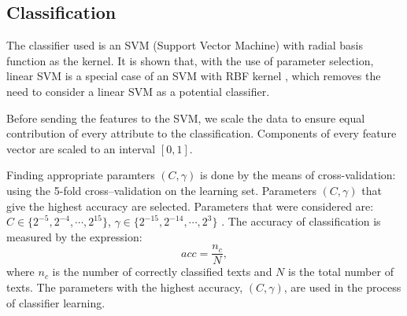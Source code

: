 \documentclass[11pt,english]{article}
\begin{document}
\begin{multicols}{2}

\section{Classification}
The classifier used is an SVM (Support Vector Machine) with radial basis
function as the kernel. It is shown that, with the use of parameter selection,
linear SVM is a special case of an SVM with RBF kernel \citep{keerthi2003asymptotic},
which removes the need to consider a linear SVM as a potential classifier.

Before sending the features to the SVM, we scale the data to ensure
equal contribution of every attribute to the classification. Components of
every feature vector are scaled to an interval $[0, 1]$.

Finding appropriate paramters $(C, \gamma)$ is done by the means of
cross-validation: using the 5-fold cross--validation on the
learning set. Parameters $(C, \gamma)$ that give the highest accuracy are
selected. Parameters that were considered are: $C \in \{2^{-5}, 2^{-4}, \cdots ,
2^{15}\}$, $\gamma \in \{2^{-15}, 2^{-14}, \cdots, 2^3\}$ \citep{CC01a}.
The accuracy of classification is measured by the expression:
\begin{equation}
acc = \frac{n_c}{N}, %
\end{equation}
where $n_c$ is the number of correctly classified texts and $N$ is the total number of
texts. The parameters with the highest accuracy, $(C, \gamma)$, 
are used in the process of classifier learning.


\end{multicols}
\end{document}

